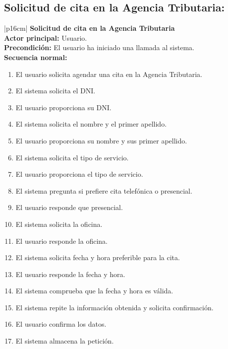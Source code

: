     \subsection{Solicitud de cita en la Agencia Tributaria:}
        \begin{longtable}{|p{16cm}|} 
        \hline
        \textbf{Solicitud de cita en la Agencia Tributaria} \\ \hline
        \textbf{Actor principal:} Usuario. \\ \hline
        \textbf{Precondición:} El usuario ha iniciado una llamada al sistema. \\ \hline
        \textbf{Secuencia normal:}\\
        \begin{minipage}[t]{\linewidth}
            \begin{enumerate}
                \item El usuario solicita agendar una cita en la Agencia Tributaria.
                \item El sistema solicita el DNI.
                \item El usuario proporciona su DNI.
                \item El sistema solicita el nombre y el primer apellido.
                \item El usuario proporciona su nombre y sus primer apellido.
                \item El sistema solicita el tipo de servicio.
                \item El usuario proporciona el tipo de servicio.
                \item El sistema pregunta si prefiere cita telefónica o presencial.
                \item El usuario responde que presencial.
                \item El sistema solicita la oficina.
                \item El usuario responde la oficina.
                \item El sistema solicita fecha y hora preferible para la cita.
                \item El usuario responde la fecha y hora.
                \item El sistema comprueba que la fecha y hora es válida.
                \item El sistema repite la información obtenida y solicita confirmación. 
                \item El usuario confirma los datos.
                \item El sistema almacena la petición.

\end{enumerate}
\end{minipage}
\end{longtable}
